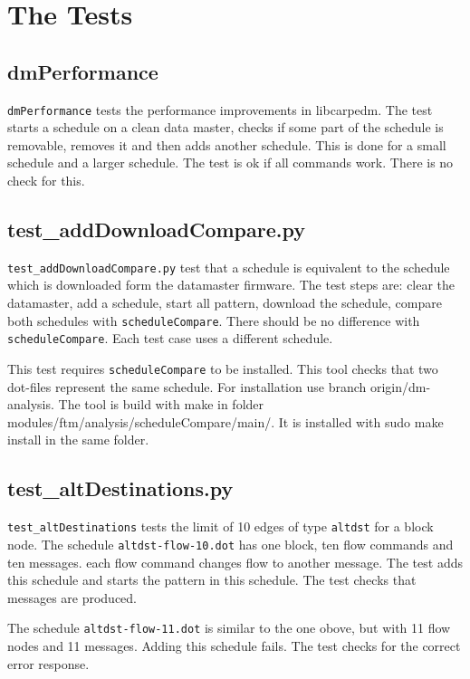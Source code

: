 \documentclass[12pt,a4paper]{report}
\begin{document}
\begin{table}
\end{table}
\chapter{The Tests}
\section{dmPerformance}
\texttt{dmPerformance} tests the performance improvements in libcarpedm.
The test starts a schedule on a clean data master, checks if some part of 
the schedule is removable, removes it and then adds another schedule. 
This is done for a small schedule and a larger schedule. The test is ok 
if all commands work. There is no check for this.

\section{test\_addDownloadCompare.py}
\texttt{test\_addDownloadCompare.py} test that a schedule is equivalent 
to the schedule which is downloaded form the datamaster firmware.
The test steps are: clear the datamaster, add a schedule, start all 
pattern, download the schedule, compare both schedules with 
\texttt{scheduleCompare}. There should be no difference with 
\texttt{scheduleCompare}. Each test case uses a different schedule.

This test requires \texttt{scheduleCompare} to be installed. This tool 
checks that two dot-files represent the same schedule. For installation 
use branch origin/dm-analysis. The tool is build with make in folder 
modules/ftm/analysis/scheduleCompare/main/. It is installed with sudo 
make install in the same folder.

\section{test\_altDestinations.py}
\texttt{test\_altDestinations} tests the limit of 10 edges of type 
\texttt{altdst} for a block node.
The schedule \texttt{altdst-flow-10.dot} has one block, ten flow commands 
and ten messages. each flow command changes flow to another message. 
The test adds this schedule and starts the pattern in this schedule. 
The test checks that messages are produced.

The schedule \texttt{altdst-flow-11.dot} is similar to the one obove, 
but with 11 flow nodes and 11 messages. Adding this schedule fails.
The test checks for the correct error response.
\end{document}
